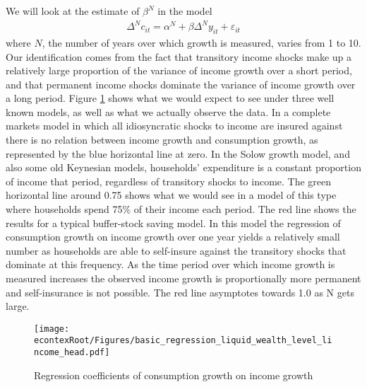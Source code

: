 \documentclass[titlepage]{\econtex}\newcommand{\texname}{ConsumptionHeterogeneity}
\begin{document}
We will look at the estimate of $\beta^N$ in the model
\begin{align*}
    \Delta^N c_{it} = \alpha^N + \beta \Delta^N y_{it} + \varepsilon_{it}
\end{align*}
where $N$, the number of years over which growth is measured, varies from 1 to 10. Our identification comes from the fact that transitory income shocks make up a relatively large proportion of the variance of income growth over a short period, and that permanent income shocks dominate the variance of income growth over a long period. Figure \ref{fig:GrowthReg} shows what we would expect to see under three well known models, as well as what we actually observe the data. In a complete markets model in which all idiosyncratic shocks to income are insured against there is no relation between income growth and consumption growth, as represented by the blue horizontal line at zero. In the Solow growth model, and also some old Keynesian models, households' expenditure is a constant proportion of income that period, regardless of transitory shocks to income. The green horizontal line around 0.75 shows what we would see in a model of this type where households spend 75\% of their income each period. The red line shows the results for a typical buffer-stock saving model. In this model the regression of consumption growth on income growth over one year yields a relatively small number as households are able to self-insure against the transitory shocks that dominate at this frequency. As the time period over which income growth is measured increases the observed income growth is proportionally more permanent and self-insurance is not possible. The red line asymptotes towards 1.0 as N gets large.
	\begin{figure} 
	\begin{centering}
		\texttt{[image: \\econtexRoot/Figures/basic\_regression\_liquid\_wealth\_level\_lincome\_head.pdf]}
		\caption{Regression coefficients of consumption growth on income growth}
		\label{fig:GrowthReg}
	\end{centering}
\end{figure}
\end{document}
